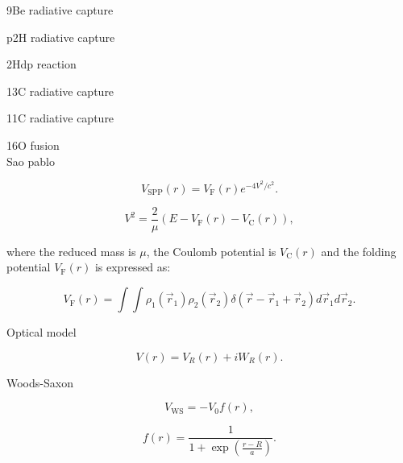 \documentclass[openany]{book}
\begin{document}
9Be radiative capture \cite{kabir_nabi_2021}

p2H radiative capture \cite{dubovichenko_dzhazairov-kakhramanov_2009}

2Hdp reaction \cite{czerski_huke_heide_ruprecht_2006}

13C radiative capture \cite{kabir_irgaziev_nabi_2020}
\cite{dubovichenko_2012}

11C radiative capture\cite{kabir_irgaziev_nabi_sagheer_2022}

16O fusion \cite{diaz-torres_gasques_wiescher_2007} \\

Sao pablo \cite{chamon_2007}


\begin{equation} \label{eq:potential_SaoPablo}
	V_{\mathrm{SPP}} (r) = V_{\mathrm{F}} (r)e^{-4V^2/c^2}.
\end{equation}


\begin{equation} \label{eq:potential_SaoPablo_speed}
	V^2 = \frac{2}{\mu} \left( E - V_{\mathrm{F}}(r) - V_{\mathrm{C}}(r) \right),
\end{equation}

where the reduced mass is $\mu$, the Coulomb potential is $V_{\mathrm{C}}(r)$ and the folding potential  $V_{\mathrm{F}}(r)$ is expressed as:


\begin{equation} \label{eq:potential_SaoPablo_folding}
	V_{\mathrm{F}}(r) = \int \int \rho_1(\vec r_1)  \rho_2(\vec r_2) \delta(\vec r - \vec r_1 +  \vec r_2) {d\vec{r}_1}  {d\vec{r}_2}.
\end{equation}



Optical model \cite{amer_penionzhkevich_2021}

\begin{equation}  \label{eq:potential_Optical}
	V(r) = V_R(r) + iW_R(r).
\end{equation}

Woods-Saxon \cite{salamon_baran_vertse_2016}
\cite{singh_sukhvinder_kharab_2013A}

\begin{equation} \label{eq:potential_WoodsSaxon2}
	V_{\mathrm{WS}} = -V_0 f(r),
\end{equation}

\begin{equation}  \label{eq:potential_WoodsSaxon2_fermiDirac}
	f(r) = \frac{1}{1 + \exp {\left(\frac{r- R}{a}\right)}}.
\end{equation}
\end{document}
